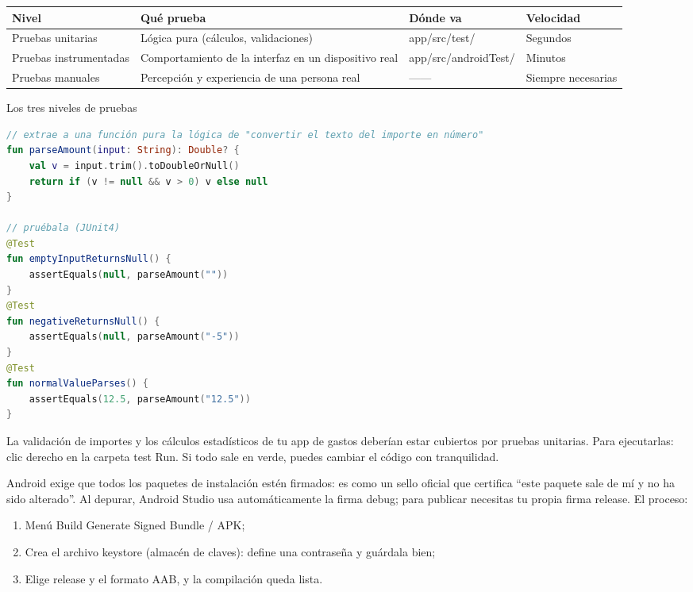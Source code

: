 \begin{center}
\begin{tabularx}{\linewidth}{|X|X|X|X|}
\hline
\textbf{Nivel} & \textbf{Qué prueba} & \textbf{Dónde va} & \textbf{Velocidad} \tabularnewline
\hline
Pruebas unitarias & Lógica pura (cálculos, validaciones) & app/src/test/ & Segundos \tabularnewline
Pruebas instrumentadas & Comportamiento de la interfaz en un dispositivo real & app/src/androidTest/ & Minutos \tabularnewline
Pruebas manuales & Percepción y experiencia de una persona real & —— & Siempre necesarias \tabularnewline
\hline
\end{tabularx}
\end{center}

\begin{center}\small\color{gray}Los tres niveles de pruebas\end{center}

\begin{lstlisting}[language=Kotlin]
// extrae a una función pura la lógica de "convertir el texto del importe en número"
fun parseAmount(input: String): Double? {
    val v = input.trim().toDoubleOrNull()
    return if (v != null && v > 0) v else null
}

// pruébala (JUnit4)
@Test
fun emptyInputReturnsNull() {
    assertEquals(null, parseAmount(""))
}
@Test
fun negativeReturnsNull() {
    assertEquals(null, parseAmount("-5"))
}
@Test
fun normalValueParses() {
    assertEquals(12.5, parseAmount("12.5"))
}
\end{lstlisting}

La validación de importes y los cálculos estadísticos de tu app de gastos deberían estar cubiertos por pruebas unitarias. Para ejecutarlas: clic derecho en la carpeta test Run. Si todo sale en verde, puedes cambiar el código con tranquilidad.


Android exige que todos los paquetes de instalación estén firmados: es como un sello oficial que certifica “este paquete sale de mí y no ha sido alterado”. Al depurar, Android Studio usa automáticamente la firma debug; para publicar necesitas tu propia firma release. El proceso:

\begin{enumerate}
  \item Menú Build Generate Signed Bundle / APK;
  \item Crea el archivo keystore (almacén de claves): define una contraseña y guárdala bien;
  \item Elige release y el formato AAB, y la compilación queda lista.
\end{enumerate}

